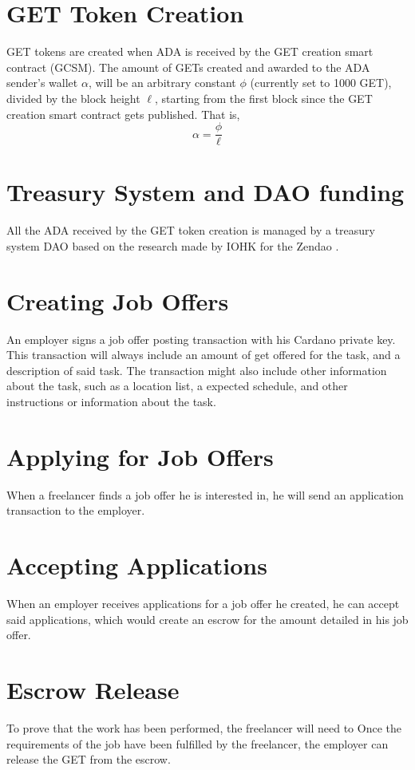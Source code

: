 \documentclass{article}
\begin{document}
\section{GET Token Creation}
GET tokens are created when ADA is received by the GET creation smart contract (GCSM).
The amount of GETs created and awarded to the ADA sender's wallet $\alpha$, will be an arbitrary constant $\phi$ (currently set to 1000 GET), divided by the block height $\ell$, starting from the first block since the GET creation smart contract gets published. That is,
\[ \alpha
  = \dfrac{\phi}{\ell}
\]

\section{Treasury System and DAO funding}
All the ADA received by the GET token creation is managed by a treasury system DAO based on the research made by IOHK for the Zendao \cite{zhangb2}.
 
\section{Creating Job Offers}
An employer signs a job offer posting transaction with his Cardano private key. This transaction will always include an amount of get offered for the task, and a description of said task. The transaction might also include other information about the task, such as a location list, a expected schedule, and other instructions or information about the task.

\section{Applying for Job Offers}
When a freelancer finds a job offer he is interested in, he will send an application transaction to the employer.

\section{Accepting Applications}
When an employer receives applications for a job offer he created, he can accept said applications, which would create an escrow for the amount detailed in his job offer.

\section{Escrow Release}
To prove that the work has been performed, the freelancer will need to Once the requirements of the job have been fulfilled by the freelancer, the employer can release the GET from the escrow.
\end{document}
